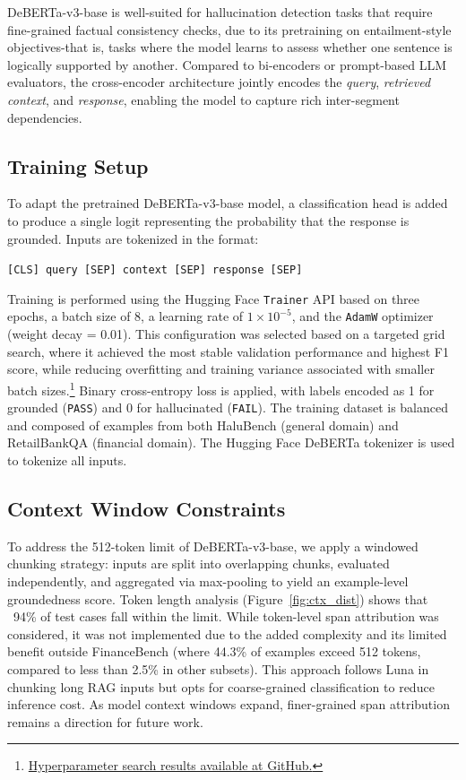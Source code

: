 \documentclass[11pt]{article}
\begin{document}
DeBERTa-v3-base is well-suited for hallucination detection tasks that require fine-grained factual consistency checks, due to its pretraining on entailment-style objectives-that is, tasks where the model learns to assess whether one sentence is logically supported by another. Compared to bi-encoders or prompt-based LLM evaluators, the cross-encoder architecture jointly encodes the \textit{query}, \textit{retrieved context}, and \textit{response}, enabling the model to capture rich inter-segment dependencies. 

\subsection{Training Setup}

To adapt the pretrained DeBERTa-v3-base model, a classification head is added to produce a single logit representing the probability that the response is grounded. Inputs are tokenized in the format:

\begin{center}
\small
\texttt{[CLS] query [SEP] context [SEP] response [SEP]}
\end{center}

Training is performed using the Hugging Face \texttt{Trainer} API based on three epochs, a batch size of 8, a learning rate of \(1 \times 10^{-5}\), and the \texttt{AdamW} optimizer (weight decay = 0.01). This configuration was selected based on a targeted grid search, where it achieved the most stable validation performance and highest F1 score, while reducing overfitting and training variance associated with smaller batch sizes.\footnote{\href{https://github.com/tahlee-stone/2024-fall-datasci-w266-tahlee-stone/blob/main/final_project/results/hyperparameter_comparison.xlsx}{Hyperparameter search results available at GitHub.}} Binary cross-entropy loss is applied, with labels encoded as 1 for grounded (\texttt{PASS}) and 0 for hallucinated (\texttt{FAIL}). The training dataset is balanced and composed of examples from both HaluBench (general domain) and RetailBankQA (financial domain). The Hugging Face DeBERTa tokenizer is used to tokenize all inputs.

\subsection{Context Window Constraints}
To address the 512-token limit of DeBERTa-v3-base, we apply a windowed chunking strategy: inputs are split into overlapping chunks, evaluated independently, and aggregated via max-pooling to yield an example-level groundedness score.
Token length analysis (Figure~\ref{fig:ctx_dist}) shows that ~94\% of test cases fall within the limit. While token-level span attribution was considered, it was not implemented due to the added complexity and its limited benefit outside FinanceBench (where 44.3\% of examples exceed 512 tokens, compared to less than 2.5\% in other subsets).
This approach follows Luna \citep{belyi2024luna} in chunking long RAG inputs but opts for coarse-grained classification to reduce inference cost. As model context windows expand, finer-grained span attribution remains a direction for future work.
\end{document}
